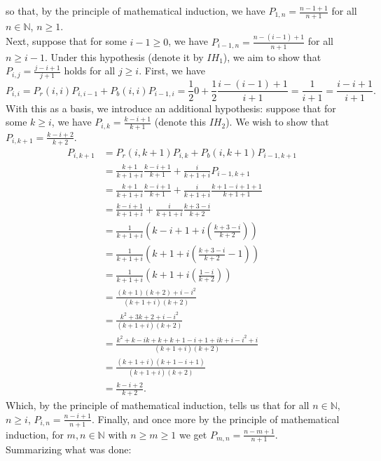 \documentclass[11pt, letterpaper]{article}
\newcommand{\mbb}[1]{\mathbb{#1}}
\begin{document}
    so that, by the principle of mathematical induction, we have $P_{1,n}=\frac{n-1+1}{n+1}$ for all $n\in\mbb{N}$, $n\geq 1$. \\[10pt]
    Next, suppose that for some $i-1\geq 0$, we have $P_{i-1,n}=\frac{n-(i-1)+1}{n+1}$ for all $n\geq i-1$. Under this hypothesis (denote it by $IH_1$), we aim to show that $P_{i,j}=\frac{j-i+1}{j+1}$ holds for all $j\geq i$. First, we have
    \[P_{i,i}=P_r(i,i)P_{i,i-1}+P_b(i,i)P_{i-1,i}=\frac{1}{2}0+\frac{1}{2}\frac{i-(i-1)+1}{i+1}=\frac{1}{i+1}=\frac{i-i+1}{i+1}.\]
    With this as a basis, we introduce an additional hypothesis: suppose that for some $k\geq i$, we have $P_{i,k}=\frac{k-i+1}{k+1}$ (denote this $IH_2$). We wish to show that $P_{i,k+1}=\frac{k-i+2}{k+2}$. 
    \begin{align*}
        P_{i,k+1}&=P_r(i,k+1)P_{i,k}+P_b(i,k+1)P_{i-1,k+1}\\
        &=\frac{k+1}{k+1+i}\frac{k-i+1}{k+1}+\frac{i}{k+1+i}P_{i-1,k+1}\tag{$IH_2$}\\
        &=\frac{k+1}{k+1+i}\frac{k-i+1}{k+1}+\frac{i}{k+1+i}\frac{k+1-i+1+1}{k+1+1}\tag{$IH_1$}\\
        &=\frac{k-i+1}{k+1+i}+\frac{i}{k+1+i}\frac{k+3-i}{k+2}\\
        &=\frac{1}{k+1+i}\left(k-i+1+i\left(\frac{k+3-i}{k+2}\right)\right)\\
        &=\frac{1}{k+1+i}\left(k+1+i\left(\frac{k+3-i}{k+2}-1\right)\right)\\
        &=\frac{1}{k+1+i}\left(k+1+i\left(\frac{1-i}{k+2}\right)\right)\\
        &=\frac{(k+1)(k+2)+i-i^2}{(k+1+i)(k+2)}\\
        &=\frac{k^2+3k+2+i-i^2}{(k+1+i)(k+2)}\\
        &=\frac{k^2+k-ik+k+k+1-i+1+ik+i-i^2+i}{(k+1+i)(k+2)}\\
        &=\frac{(k+1+i)(k+1-i+1)}{(k+1+i)(k+2)}\\
        &=\frac{k-i+2}{k+2}.
    \end{align*}
    Which, by the principle of mathematical induction, tells us that for all $n\in\mbb{N}$, $n\geq i$, $P_{i,n}=\frac{n-i+1}{n+1}$. Finally, and once more by the 
    principle of mathematical induction, for $m,n\in\mbb{N}$ with $n\geq m\geq 1$ we get $P_{m,n}=\frac{n-m+1}{n+1}$.\\[10pt]
    Summarizing what was done:
\end{document}
